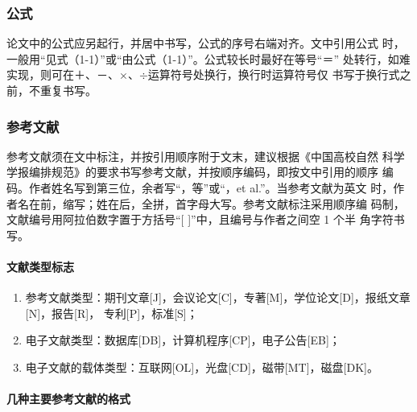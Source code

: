 \subsubsection{公式}
\label{sec:eq}

   论文中的公式应另起行，并居中书写，公式的序号右端对齐。文中引用公式
时，一般用“见式（1-1）”或“由公式（1-1）”。公式较长时最好在等号“\(＝\)”
处转行，如难实现，则可在\(＋\)、\(－\)、\(\times\)、\(\div\)运算符号处换行，换行时运算符号仅
书写于换行式之前，不重复书写。

\subsubsection{参考文献}
\label{sec:refs}

参考文献须在文中标注，并按引用顺序附于文末，建议根据《中国高校自然
科学学报编排规范》的要求书写参考文献，并按顺序编码，即按文中引用的顺序
编码。作者姓名写到第三位，余者写“，等”或“，et al.”。当参考文献为英文
时，作者名在前，缩写；姓在后，全拼，首字母大写。参考文献标注采用顺序编
码制，文献编号用阿拉伯数字置于方括号“[ ]”中，且编号与作者之间空 1 个半
角字符书写。

\paragraph{文献类型标志}

\begin{enumerate}
\item 参考文献类型：期刊文章[J]，会议论文[C]，专著[M]，学位论文[D]，报纸文章[N]，报告[R]，
  专利[P]，标准[S]；
\item 电子文献类型：数据库[DB]，计算机程序[CP]，电子公告[EB]；
\item 电子文献的载体类型：互联网[OL]，光盘[CD]，磁带[MT]，磁盘[DK]。
\end{enumerate}

\paragraph{几种主要参考文献的格式}

